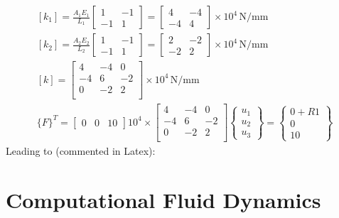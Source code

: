\documentclass[class=report, crop=false, 12pt,a4paper]{standalone}
\begin{document}
\begin{gather}
	\left[k_1\right] = \frac{A_1E_1}{L_1} \begin{bmatrix}
		1 & -1\\
		-1 & 1
	\end{bmatrix} = \begin{bmatrix}
		4 & -4\\
		-4 & 4
	\end{bmatrix}\times 10^4\, \si{\newton\per\milli\meter}\\
	\left[k_2\right] = \frac{A_2E_2}{L_2} \begin{bmatrix}
		1 & -1\\
		-1 & 1
	\end{bmatrix} = \begin{bmatrix}
		2 & -2\\
		-2 & 2
	\end{bmatrix}\times 10^4\, \si{\newton\per\milli\meter}\\
	\left[k\right] = \begin{bmatrix}
		4 & -4 & 0\\
		-4 & 6 & -2\\
		0 & -2 & 2\\
	\end{bmatrix}\times 10^4\, \si{\newton\per\milli\meter}\\
	\{F\}^T = \begin{bmatrix}
		0 & 0 & 10
	\end{bmatrix}
	10^4\times\begin{bmatrix}
		4 & -4 & 0\\
		-4 & 6 & -2\\
		0 & -2 & 2\\
	\end{bmatrix}\begin{Bmatrix}
		u_1\\
		u_2\\
		u_3
	\end{Bmatrix} = \begin{Bmatrix}
		0 + R1\\
		0\\
		10
	\end{Bmatrix}
\end{gather}
Leading to (commented in Latex):
\chapter{Computational Fluid Dynamics}
\end{document}
